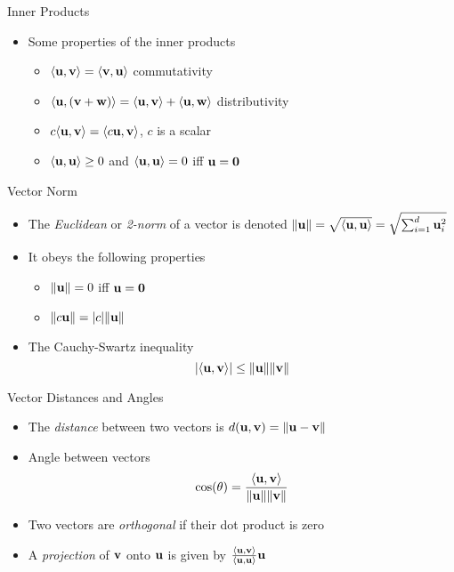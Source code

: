 \documentclass{beamer}
\begin{document}
\begin{frame}{Inner Products}
\begin{itemize}
  \item Some properties of the inner products
 \begin{itemize}
 \item $\langle \textbf{u}, \textbf{v} \rangle = \langle \textbf{v}, \textbf{u} \rangle$ commutativity 
 \item $\langle \textbf{u}, (\textbf{v} + \textbf{w}) \rangle = \langle \textbf{u}, \textbf{v} \rangle + \langle \textbf{u}, \textbf{w} \rangle$ distributivity 
 \item $c \langle \textbf{u}, \textbf{v} \rangle = \langle c \textbf{u}, \textbf{v} \rangle$, $c$ is a scalar 
 \item $ \langle \textbf{u}, \textbf{u} \rangle \geq 0$ and $ \langle \textbf{u}, \textbf{u} \rangle = 0$ iff $\textbf{u} = \textbf{0}$  
 \end{itemize}
\end{itemize}
\end{frame}


\begin{frame}{Vector Norm}  
\begin{itemize} 
 \item The \emph{Euclidean} or \emph{2-norm} of a vector is denoted $\|\textbf{u}\| =  \sqrt{\langle \textbf{u}, \textbf{u} \rangle} = \sqrt{\sum_{i=1}^d \textbf{u}_i^2}$
 \item It obeys the following properties	
 \begin{itemize}
 \item  $\|\textbf{u}\| = 0$ iff $\textbf{u} = \textbf{0}$ 
 \item $\|c\textbf{u}\| = |c|\|\textbf{u}\|$
 \end{itemize}
 \item The Cauchy-Swartz inequality
  \begin{displaymath} 
   |\langle \textbf{u}, \textbf{v} \rangle| \leq \|\textbf{u}\|\|\textbf{v}\|
  \end{displaymath}
\end{itemize}
\end{frame}

\begin{frame}{Vector Distances and Angles}  
\begin{itemize} 
 \item The \emph{distance} between two vectors is $d(\textbf{u}, \textbf{v}) = \|\textbf{u} - \textbf{v}\|$ 
 \item Angle between vectors 
 \begin{displaymath} 
  \cos(\theta) = \frac{\langle \textbf{u}, \textbf{v} \rangle}{\|\textbf{u}\|\|\textbf{v}\|}
 \end{displaymath}
 \item Two vectors are \emph{orthogonal} if their dot product is zero 
 \item A \emph{projection} of $\textbf{v}$ onto $\textbf{u}$ is given by $\frac{\langle \textbf{u}, \textbf{v} \rangle}{\langle \textbf{u}, \textbf{u} \rangle}\textbf{u}$   
\end{itemize}
\end{frame} 
\end{document}
